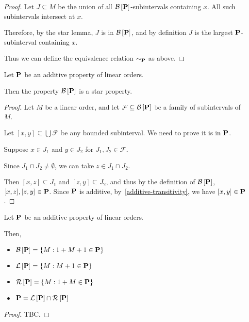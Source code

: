 \begin{proof}
  Let $J \subseteq M$ be the union of all $\mathcal{B} \left[ {{\mathbf{P}}} \right]$-subintervals containing $x$.
  All such subintervals intersect at $x$.

  Therefore, by the star lemma, $J$ is in $\mathcal{B} \left[ {{\mathbf{P}}} \right]$, and by definition
  $J$ is the largest $\mathbf{P}$-subinterval containing $x$.

  Thus we can define the equivalence relation $\sim_{\mathbf{P}}$ as above.
\end{proof}

\begin{lemma}\label{star-lemma}
  Let $\mathbf{P}$ be an additive property of linear orders.

  Then the property $\mathcal{B} \left[ {{\mathbf{P}}} \right]$ is a star property.
\end{lemma}

\begin{proof}
  Let $M$ be a linear order,
  and let $\mathcal{F} \subseteq \mathcal{B} \left[ {{\mathbf{P}}} \right]$ be a family of subintervals of $M$.

  Let $[x, y] \subseteq \bigcup \mathcal{F}$ be any bounded subinterval. We need to prove
  it is in $\mathbf{P}$.

  Suppose $x \in J_1$ and $y \in J_2$ for $J_1, J_2 \in \mathcal{F}$.

  Since $J_1 \cap J_2 \ne \emptyset$, we can take $z \in J_1 \cap J_2$.

  Then $[x, z] \subseteq J_1$ and $[z, y] \subseteq J_2$,
  and thus by the definition of $\mathcal{B} \left[ {{\mathbf{P}}} \right]$, $[x, z], [z, y] \in \mathbf{P}$.
  Since $\mathbf{P}$ is additive, by~\cref{additive-transitivity}, we have $[x, y] \in \mathbf{P}$.
\end{proof}

\begin{lemma}\label{bounded-properties}
  Let $\mathbf{P}$ be an additive property of linear orders.

  Then,
  \begin{itemize}
    \item $\mathcal{B} \left[ {{\mathbf{P}}} \right] = \left\{ {M : 1 + M + 1 \in \mathbf{P}} \right\}$
    \item $\mathcal{L} \left[ {{\mathbf{P}}} \right] = \left\{ {M : M + 1 \in \mathbf{P}} \right\}$
    \item $\mathcal{R} \left[ {{\mathbf{P}}} \right] = \left\{ {M : 1 + M \in \mathbf{P}} \right\}$
    \item $\mathbf{P} = \mathcal{L} \left[ {{\mathbf{P}}} \right] \cap \mathcal{R} \left[ {{\mathbf{P}}} \right]$
  \end{itemize}
\end{lemma}

\begin{proof}
  TBC.
\end{proof}

